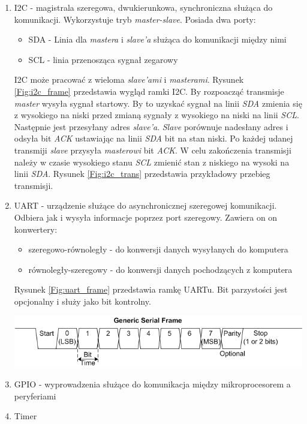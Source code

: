 \documentclass[11pt,a4paper]{article}
\begin{document}
\begin{enumerate}
			\item I2C - magistrala szeregowa, dwukierunkowa, synchroniczna służąca do komunikacji. Wykorzystuje tryb \textit{master-slave}. Posiada dwa porty:
			\begin{itemize}
				\item SDA - Linia dla \textit{mastera} i \textit{slave'a} służąca do komunikacji między nimi
				\item SCL - linia przenosząca sygnał zegarowy
			\end{itemize}
			I2C może pracować z wieloma \textit{slave'ami} i \textit{masterami}. Rysunek \ref{Fig:i2c_frame} przedstawia wygląd ramki I2C. By rozpoacząć transmisje \textit{master} wysyła sygnał startowy. By to uzyskać sygnał na linii \textit{SDA} zmienia się z wysokiego na niski przed zmianą sygnały z wysokiego na niski na linii \textit{SCL}. Następnie jest przesyłany adres \textit{slave'a}. \textit{Slave} porównuje nadesłany adres i odsyła bit \textit{ACK} ustawiając na linii \textit{SDA} bit na stan niski. Po każdej udanej transmiji \textit{slave} przysyła \textit{masterowi} bit \textit{ACK}. W celu zakończenia transmisji należy w czasie wysokiego stanu \textit{SCL} zmienić stan z niskiego na wysoki na linii \textit{SDA}. Rysunek \ref{Fig:i2c_trans} przedstawia przykładowy przebieg transmisji.\cite{i2c_book}


			\item UART - urządzenie służące do asynchronicznej szeregowej komunikacji. Odbiera jak i wysyła informacje poprzez port szeregowy. Zawiera on on konwertery:
			\begin{itemize}
				\item szeregowo-równoległy - do konwersji danych wysyłanych do komputera
				\item równoległy-szeregowy - do konwersji danych pochodzących z komputera
			\end{itemize}	
			Rysunek \ref{Fig:uart_frame} przedstawia ramkę UARTu. Bit parzystości jest opcjonalny i służy jako bit kontrolny.\cite{uart_book}
			\begin{samepage}
				\nopagebreak
				\begin{center}
					\includegraphics[width=13cm]{./rysunki/uart_frame.png}
				\end{center}
			\end{samepage}
			\item GPIO - wyprowadzenia służące do komunikacja między mikroprocesorem a peryferiami \cite{gpio_doc}
			\item Timer
			\end{enumerate}
\end{document}
